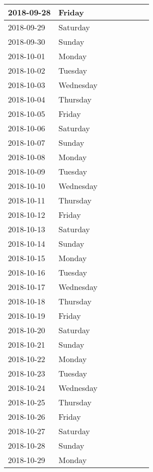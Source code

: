 \documentclass[10pt,a4paper]{article}
\begin{document}
\begin{longtable}{| p{} p{} | p{} | p{} | p{} | p{} | p{} | p{} |}
2018-09-28	&Friday		& & & & & &\\ \hline
2018-09-29	&Saturday	& & & & & &\\ \hline
2018-09-30	&Sunday		& & & & & &\\ \hline
2018-10-01	&Monday		& & & & & &\\ \hline
2018-10-02	&Tuesday	& & & & & &\\ \hline
2018-10-03	&Wednesday	& & & & & &\\ \hline
2018-10-04	&Thursday	& & & & & &\\ \hline
2018-10-05	&Friday		& & & & & &\\ \hline
2018-10-06	&Saturday	& & & & & &\\ \hline
2018-10-07	&Sunday		& & & & & &\\ \hline
2018-10-08	&Monday		& & & & & &\\ \hline
2018-10-09	&Tuesday	& & & & & &\\ \hline
2018-10-10	&Wednesday	& & & & & &\\ \hline
2018-10-11	&Thursday	& & & & & &\\ \hline
2018-10-12	&Friday		& & & & & &\\ \hline
2018-10-13	&Saturday	& & & & & &\\ \hline
2018-10-14	&Sunday		& & & & & &\\ \hline
2018-10-15	&Monday		& & & & & &\\ \hline
2018-10-16	&Tuesday	& & & & & &\\ \hline
2018-10-17	&Wednesday	& & & & & &\\ \hline
2018-10-18	&Thursday	& & & & & &\\ \hline
2018-10-19	&Friday		& & & & & &\\ \hline
2018-10-20	&Saturday	& & & & & &\\ \hline
2018-10-21	&Sunday		& & & & & &\\ \hline
2018-10-22	&Monday		& & & & & &\\ \hline
2018-10-23	&Tuesday	& & & & & &\\ \hline
2018-10-24	&Wednesday	& & & & & &\\ \hline
2018-10-25	&Thursday	& & & & & &\\ \hline
2018-10-26	&Friday		& & & & & &\\ \hline
2018-10-27	&Saturday	& & & & & &\\ \hline
2018-10-28	&Sunday		& & & & & &\\ \hline
2018-10-29	&Monday		& & & & & &\\ \hline

\end{longtable}
\end{document}
